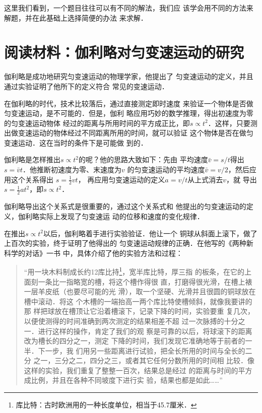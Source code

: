     这里我们看到，一个题目往往可以有不同的解法，我们应
该学会用不同的方法来解题，并在此基础上选择简便的办法
来求解．


\section*{阅读材料：伽利略对匀变速运动的研究}
   伽利略是成功地研究匀变速运动的物理学家，他提出了
匀变速运动的定义，并且通过实验证明了他所下的定义符合
常见的变速运动．

    在伽利略的时代，技术比较落后，通过直接测定即时速度
来验证一个物体是否做匀变速运动，是不可能的．但是，伽利
略应用巧妙的数学推理，得出初速度为零的匀变速运动物体
经过的距离与所用时间的平方成正比，即$s\propto t^2$．这样，只要测
出做变速运动的物体经过不同距离所用的时间，就可以验证
这个物体是否在做匀变速运动．这在当时的条件下是可能做
到的．

    伽利略是怎样推出$s\propto t^2$的呢？他的思路大致如下：先由
平均速度$\bar v=s/t$得出$s=\bar v t$．他推断初速度为零、末速度为$v$
的匀变速运动的平均速度$\bar v=v/2$，然后应用这个关系得出
$s=\frac{1}{2} v t$，
再应用匀变速运动的定义$a=v/t$从上式消去$v$，就
导出$s=\frac{1}{2} a t^2$，即$s\propto t^2$．

  伽利略导出这个关系式是很重要的，通过这个关系式和
他提出的匀变速运动的定义，伽利略实际上发现了匀变速运
动的位移和速度的变化规律．

    在推出$s\propto t^2$以后，伽利略着手进行实验验证．他让一个
铜球从斜面上滚下，做了上百次的实验，终于证明了他得出的
匀变速运动规律的正确．在他写的《两种新科学的对话》一书
中，具体介绍了他的实验方法和过程：

\begin{quotation}
    “用一块木料制成长约12库比持\footnote{库比特：古时欧洲用的一种长度单位，相当于45.7厘米．
}，宽半库比特，厚三指
的板条，在它的上面刻一条比一指略宽的槽，将这个槽作得很
直，打磨得很光滑，在槽上裱一层羊皮纸（也要尽可能的光
滑），取一个坚硬、光滑并且很圆的铜球放在槽中滚动．将这
个木槽的一端抬高一两个库比特使槽倾斜，就像我要讲的那
样把球放在槽顶让它沿着槽滚下，记录下降的时间，实验要重
复几次，以便使测得的时间准确到两次测定的结果相差不超
过一次脉搏的十分之一．进行这样的操作，肯定了我们的观
察是可靠的以后，将球滚下的距离改为槽长的四分之一，测定
下降的时间，我们发现它准确地等于前者的一半．下一步，我
们用另一些距离进行试验，把全长所用的时间与全长的二分
之一，三分之二，四分之三，或者其它任何分数所用的时间相
比较．像这样的实验，我们重复了整整一百次，结果总是经过
的距离与时间的平方成比例，并且在各种不同坡度下进行实
验，结果也都是如此……”
\end{quotation}

